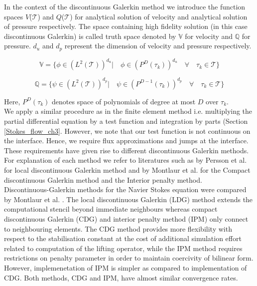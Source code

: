 \documentclass[a4paper,twoside,openright]{book}
\begin{document}
In the context of the discontinuous Galerkin method we introduce the function spaces $V$($\mathcal{T}$) and $Q$($\mathcal{T}$) for analytical solution of velocity and analytical solution of pressure respectively. The space containing high fidelity solution (in this case discontinuous Galerkin) is called truth space denoted by $\mathbb{V}$ for velocity and $\mathbb{Q}$ for pressure. $d_u$ and $d_p$ represent the dimension of velocity and pressure respectively.

\begin{equation} \label{velocity_test}
\mathbb{V} = \lbrace \phi \in (L^2(\mathcal{T}))^{d_u}| \quad \phi \in (P^D(\tau_k))^{d_u} \quad \forall \quad {\tau_k} \in \mathcal{T} \rbrace
\end{equation}

\begin{equation} \label{pressure_test}
\mathbb{Q} = \lbrace \psi \in (L^2(\mathcal{T}))^{d_p}| \quad \psi \in (P^{D-1}(\tau_k))^{d_p} \quad \forall \quad {\tau_k} \in \mathcal{T} \rbrace
\end{equation}

Here, $P^D(\tau_k)$ denotes space of polynomials of degree at most $D$ over $\tau_k$.\\

We apply a similar procedure as in the finite element method i.e. multiplying the partial differential equation by a test function and integration by parts (Section \ref{Stokes_flow_ch3}. However, we note that our test function is not continuous on the interface. Hence, we require flux approximations and jumps at the interface. These requirements have given rise to different discontinuous Galerkin methods. For explanation of each method we refer to literatures such as by Persson et al. \cite{persson} for local discontinuous Galerkin method and by Montlaur et al. \cite{Montlaur} for the Compact discontinuous Galerkin method and the Interior penalty method. \\

Discontinuous-Galerkin methods for the Navier Stokes equation were compared by Montlaur et al. \cite{Montlaur}. The local discontinuous Galerkin (LDG) method extends the computational stencil beyond immediate neighbours whereas compact discontinuous Galerkin (CDG) and interior penalty method (IPM) only connect to neighbouring elements. The CDG method provides more flexibility with respect to the stabilisation constant at the cost of additional simulation effort related to computation of the lifting operator, while the IPM method requires restrictions on penalty parameter in order to maintain coercivity of bilinear form. However, implemenetation of IPM is simpler as compared to implementation of CDG. Both methods, CDG and IPM, have almost similar convergence rates. 
\end{document}
